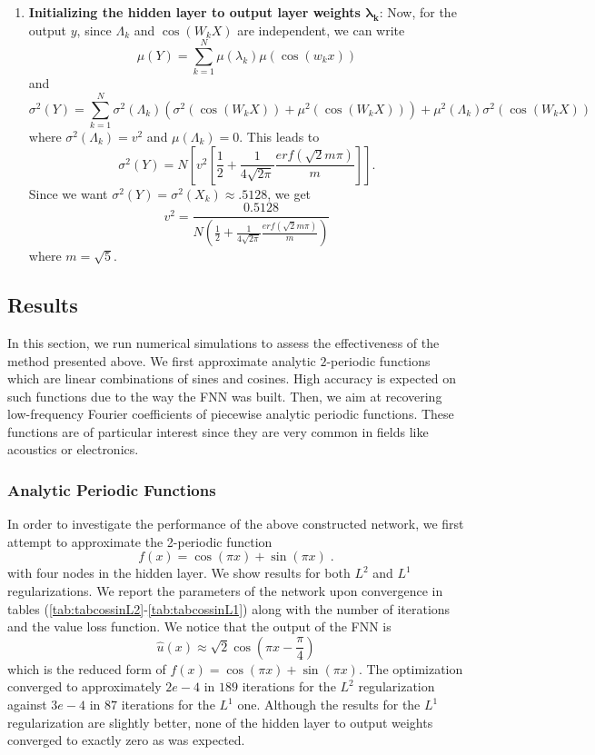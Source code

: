 \documentclass[AMS,STIX1COL]{WileyNJD-v2}
\begin{document}
\begin{enumerate}
    \item \textbf{Initializing the hidden layer to output layer weights  $\mathbf{\lambda_k}$}: Now, for the output $y$, since $\Lambda_k$ and $\cos(W_k X)$ are independent, we can write $$\mu(Y) = \sum_{k = 1}^N \mu(\lambda_k) \mu(\cos(w_k x  ))$$ and $$\sigma^2(Y) = \sum_{k = 1}^N \sigma^2 (\Lambda_k)  \left(\sigma^2\left(\cos(W_k X)\right)+\mu^2\left(\cos(W_k X)\right) \right) +  \mu^2(\Lambda_k)\sigma^2\left(\cos(W_k X)\right)$$ 
    where $\sigma^2 (\Lambda_k) = v^2$ and $\mu(\Lambda_k) = 0$. This leads to
\begin{equation}\label{Eq:vary}
    \sigma^2(Y) = N\left[ v^2\left[\frac{1}{2} + \frac{1}{4\sqrt{2\pi}}\frac{erf\left(\sqrt{2}m\pi\right)}{m}\right] \right].
\end{equation}
Since we want $\sigma^2(Y) = \sigma^2(X_k) \approx .5128$, we get 
\begin{equation}\label{Eq:varweight2}
    v^2 = \frac{0.5128}{N\left(\frac{1}{2} + \frac{1}{4\sqrt{2\pi}}\frac{erf\left(\sqrt{2}m\pi\right)}{m}\right)} 
\end{equation}
where $m = \sqrt{5}$.
\end{enumerate}





\subsection{Results}\label{subsec:results}
In this section, we run numerical simulations to assess the effectiveness of the method presented above. We first approximate analytic $2$-periodic functions which are linear combinations of sines and cosines. High accuracy is expected on such functions due to the way the FNN was built. Then, we aim at recovering low-frequency Fourier coefficients of piecewise analytic periodic functions. These functions are of particular interest since they are very common in fields like acoustics or electronics.
\subsubsection{Analytic Periodic Functions}
In order to investigate the performance of the above constructed network, we first attempt to approximate the 2-periodic function 
 $$
 f(x) = \cos(\pi x) + \sin(\pi x)\;.
 $$
 with four nodes in the hidden layer. We show results for both $L^2$ and $L^1$ regularizations.
We report the parameters of the network upon convergence in tables (\ref{tab:tabcossinL2}-\ref{tab:tabcossinL1}) along with the number of iterations and the value loss function. We notice that the output of the FNN is
$$\hat{u}(x) \approx \sqrt{2}\cos(\pi x - \frac{\pi}{4})$$ 
which is the reduced form of  $f(x)= \cos(\pi x) + \sin(\pi x)$. The optimization converged to approximately $2e-4$ in $189$ iterations for the $L^2$ regularization against $3e-4$ in $87$ iterations for the $L^1$ one. Although the results for the $L^1$ regularization are slightly better, none of the hidden layer to output weights converged to exactly zero as was expected.
\end{document}
